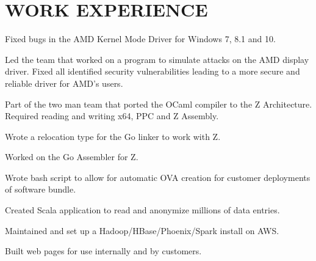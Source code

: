 \documentclass[letterpaper]{deedy-resume-modified} %
\begin{document}
\begin{minipage}[t]{0.66\textwidth} %
\vspace{16pt}

\section{WORK EXPERIENCE}


\vspace{\topsep}
\begin{tightitemize}
\item Fixed bugs in the AMD Kernel Mode Driver for Windows 7, 8.1 and 10.
\item Led the team that worked on a \CPP program to simulate attacks on the AMD display driver.  Fixed all identified security vulnerabilities leading to a more secure and reliable driver for AMD's users.
\end{tightitemize}

\sectionspace %


\begin{tightitemize}
\item Part of the two man team that ported the OCaml compiler to the Z Architecture. Required reading and writing x64, PPC and Z Assembly.
\item Wrote a relocation type for the Go linker to work with Z.
\item Worked on the Go Assembler for Z.
\end{tightitemize}

\sectionspace %



\begin{tightitemize}
\item Wrote bash script to allow for automatic OVA creation for customer deployments of software bundle.
\item Created Scala application to read and anonymize millions of data entries.
\item Maintained and set up a Hadoop/HBase/Phoenix/Spark install on AWS.
\item Built web pages for use internally and by customers.
\end{tightitemize}


\end{minipage}
\end{document}

